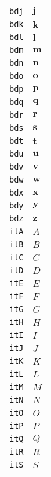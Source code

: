 \begin{longtable}{ll}
\texttt{bdj}&${}{\textbf{j}}{}$\\
\texttt{bdk}&${}{\textbf{k}}{}$\\
\texttt{bdl}&${}{\textbf{l}}{}$\\
\texttt{bdm}&${}{\textbf{m}}{}$\\
\texttt{bdn}&${}{\textbf{n}}{}$\\
\texttt{bdo}&${}{\textbf{o}}{}$\\
\texttt{bdp}&${}{\textbf{p}}{}$\\
\texttt{bdq}&${}{\textbf{q}}{}$\\
\texttt{bdr}&${}{\textbf{r}}{}$\\
\texttt{bds}&${}{\textbf{s}}{}$\\
\texttt{bdt}&${}{\textbf{t}}{}$\\
\texttt{bdu}&${}{\textbf{u}}{}$\\
\texttt{bdv}&${}{\textbf{v}}{}$\\
\texttt{bdw}&${}{\textbf{w}}{}$\\
\texttt{bdx}&${}{\textbf{x}}{}$\\
\texttt{bdy}&${}{\textbf{y}}{}$\\
\texttt{bdz}&${}{\textbf{z}}{}$\\
\texttt{itA}&${}{\textit{A}}{}$\\
\texttt{itB}&${}{\textit{B}}{}$\\
\texttt{itC}&${}{\textit{C}}{}$\\
\texttt{itD}&${}{\textit{D}}{}$\\
\texttt{itE}&${}{\textit{E}}{}$\\
\texttt{itF}&${}{\textit{F}}{}$\\
\texttt{itG}&${}{\textit{G}}{}$\\
\texttt{itH}&${}{\textit{H}}{}$\\
\texttt{itI}&${}{\textit{I}}{}$\\
\texttt{itJ}&${}{\textit{J}}{}$\\
\texttt{itK}&${}{\textit{K}}{}$\\
\texttt{itL}&${}{\textit{L}}{}$\\
\texttt{itM}&${}{\textit{M}}{}$\\
\texttt{itN}&${}{\textit{N}}{}$\\
\texttt{itO}&${}{\textit{O}}{}$\\
\texttt{itP}&${}{\textit{P}}{}$\\
\texttt{itQ}&${}{\textit{Q}}{}$\\
\texttt{itR}&${}{\textit{R}}{}$\\
\texttt{itS}&${}{\textit{S}}{}$\\

\end{longtable}
